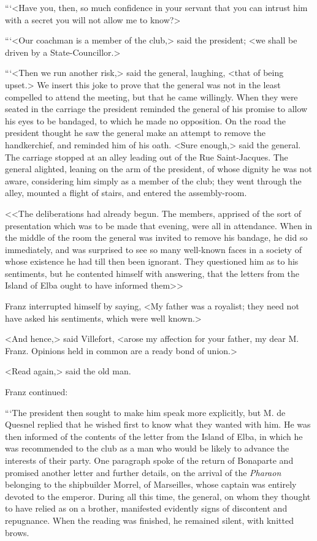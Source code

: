  “‘<Have you, then, so much confidence in your servant that you can intrust him with a secret you will not allow me to know?> 

 “‘<Our coachman is a member of the club,> said the president; <we shall be driven by a State-Councillor.> 

 “‘<Then we run another risk,> said the general, laughing, <that of being upset.> We insert this joke to prove that the general was not in the least compelled to attend the meeting, but that he came willingly. When they were seated in the carriage the president reminded the general of his promise to allow his eyes to be bandaged, to which he made no opposition. On the road the president thought he saw the general make an attempt to remove the handkerchief, and reminded him of his oath. <Sure enough,> said the general. The carriage stopped at an alley leading out of the Rue Saint-Jacques. The general alighted, leaning on the arm of the president, of whose dignity he was not aware, considering him simply as a member of the club; they went through the alley, mounted a flight of stairs, and entered the assembly-room. 

 <<The deliberations had already begun. The members, apprised of the sort of presentation which was to be made that evening, were all in attendance. When in the middle of the room the general was invited to remove his bandage, he did so immediately, and was surprised to see so many well-known faces in a society of whose existence he had till then been ignorant. They questioned him as to his sentiments, but he contented himself with answering, that the letters from the Island of Elba ought to have informed them\longdash>> 

 Franz interrupted himself by saying, <My father was a royalist; they need not have asked his sentiments, which were well known.> 

 <And hence,> said Villefort, <arose my affection for your father, my dear M. Franz. Opinions held in common are a ready bond of union.> 

 <Read again,> said the old man. 

 Franz continued: 

 “‘The president then sought to make him speak more explicitly, but M. de Quesnel replied that he wished first to know what they wanted with him. He was then informed of the contents of the letter from the Island of Elba, in which he was recommended to the club as a man who would be likely to advance the interests of their party. One paragraph spoke of the return of Bonaparte and promised another letter and further details, on the arrival of the \textit{Pharaon} belonging to the shipbuilder Morrel, of Marseilles, whose captain was entirely devoted to the emperor. During all this time, the general, on whom they thought to have relied as on a brother, manifested evidently signs of discontent and repugnance. When the reading was finished, he remained silent, with knitted brows. 

